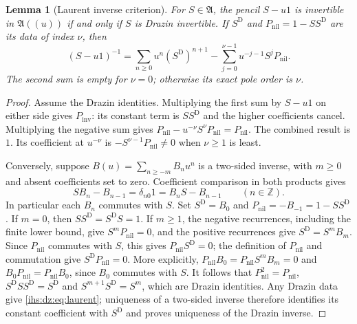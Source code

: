 \documentclass[11pt,a4paper]{article}
\numberwithin{equation}{section}
\newtheorem{lemma}[lemma]{Lemma}
\theoremstyle{definition}
\theoremstyle{remark}
\newcommand{\Z}{\mathbb Z}
\newcommand{\Alg}{\mathfrak A}
\begin{document}
\begin{lemma}[Laurent inverse criterion]\label{ihs:dz:lem:laurent}
For $S\in\Alg$, the pencil $S-u1$ is invertible in $\Alg((u))$ if and only if
$S$ is Drazin invertible. If $S^{\mathrm D}$ and
$P_{\mathrm{nil}}=1-SS^{\mathrm D}$ are its data of index $\nu$, then
\begin{equation}\label{ihs:dz:eq:laurent}
 (S-u1)^{-1}=\sum_{n\ge0}u^n(S^{\mathrm D})^{n+1}
            -\sum_{j=0}^{\nu-1}u^{-j-1}S^jP_{\mathrm{nil}}.
\end{equation}
The second sum is empty for $\nu=0$; otherwise its exact pole order is $\nu$.
\end{lemma}
\begin{proof}
Assume the Drazin identities. Multiplying the first sum by $S-u1$ on either
side gives $P_{\mathrm{inv}}$: its constant term is $SS^{\mathrm D}$ and the
higher coefficients cancel. Multiplying the negative sum gives
$P_{\mathrm{nil}}-u^{-\nu}S^\nu P_{\mathrm{nil}}=P_{\mathrm{nil}}$. The
combined result is $1$. Its coefficient at $u^{-\nu}$ is
$-S^{\nu-1}P_{\mathrm{nil}}\ne0$ when $\nu\ge1$ is least.

Conversely, suppose $B(u)=\sum_{n\ge-m}B_nu^n$ is a two-sided inverse, with
$m\ge0$ and absent coefficients set to zero. Coefficient comparison in both
products gives
\begin{equation}\label{ihs:dz:eq:recurrence}
 SB_n-B_{n-1}=\delta_{n0}1=B_nS-B_{n-1}\qquad(n\in\Z).
\end{equation}
In particular each $B_n$ commutes with $S$. Set $S^{\mathrm D}=B_0$ and
$P_{\mathrm{nil}}=-B_{-1}=1-SS^{\mathrm D}$. If $m=0$, then
$SS^{\mathrm D}=S^{\mathrm D}S=1$. If $m\ge1$, the negative recurrences,
including the finite lower bound, give $S^mP_{\mathrm{nil}}=0$, and the
positive recurrences give $S^{\mathrm D}=S^mB_m$. Since $P_{\mathrm{nil}}$
commutes with $S$, this gives $P_{\mathrm{nil}}S^{\mathrm D}=0$; the
definition of $P_{\mathrm{nil}}$ and commutation give
$S^{\mathrm D}P_{\mathrm{nil}}=0$. More explicitly,
$P_{\mathrm{nil}}B_0=P_{\mathrm{nil}}S^mB_m=0$ and
$B_0P_{\mathrm{nil}}=P_{\mathrm{nil}}B_0$, since $B_0$ commutes with $S$.
It follows that
$P_{\mathrm{nil}}^2=P_{\mathrm{nil}}$, $S^{\mathrm D}SS^{\mathrm D}=S^{\mathrm D}$
and $S^{m+1}S^{\mathrm D}=S^m$, which are Drazin identities. Any Drazin data
give \eqref{ihs:dz:eq:laurent}; uniqueness of a two-sided inverse therefore
identifies its constant coefficient with $S^{\mathrm D}$ and proves
uniqueness of the Drazin inverse.
\end{proof}
\end{document}
